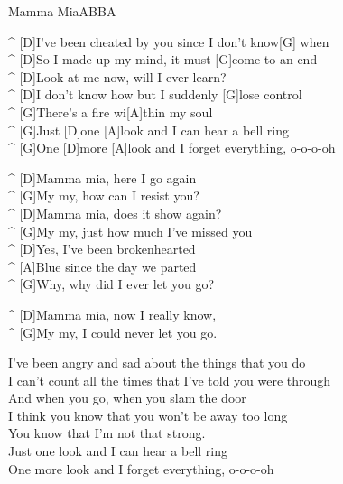 \begin{song}{Mamma Mia}{ABBA}

\vspace{-0.5cm}
\begin{guitar}
^ [D]I've been cheated by you since I don't know[G] when\\
^ [D]So I made up my mind, it must [G]come to an end\\
^ [D]Look at me now, will I ever learn?\\
^ [D]I don't know how but I suddenly [G]lose control\\
^ [G]There's a fire wi[A]thin my soul\\
^ [G]Just [D]one [A]look and I can hear a bell ring\\
^ [G]One [D]more [A]look and I forget everything, o-o-o-oh\\
\end{guitar}

\begin{guitar}
^ [D]Mamma mia, here I go again\\
^ [G]My my, how can I resist you?\\
^ [D]Mamma mia, does it show again?\\
^ [G]My my, just how much I've missed you\\
^ [D]Yes, I've been brokenhearted\\
^ [A]Blue since the day we parted\\
^ [G]Why, why did I ever let you go?\\
\end{guitar}

\begin{guitar}
^ [D]Mamma mia, now I really know,\\
^ [G]My my, I could never let you go.\\
\end{guitar}

\begin{guitar}
I've been angry and sad about the things that you do\\
I can't count all the times that I've told you were through\\
And when you go, when you slam the door\\
I think you know that you won't be away too long\\
You know that I'm not that strong.\\
Just one look and I can hear a bell ring\\
One more look and I forget everything, o-o-o-oh\\
\end{guitar}


\end{song}
